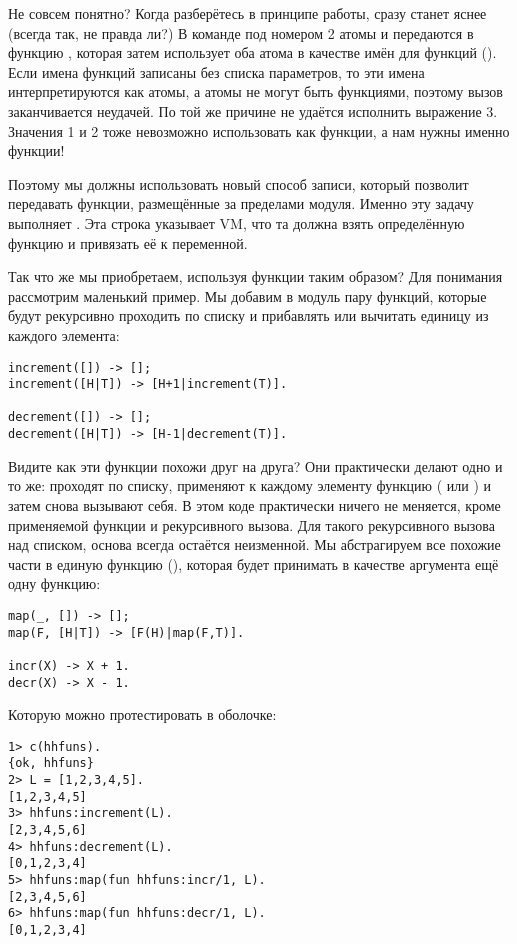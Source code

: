 Не совсем понятно? Когда разберётесь в принципе работы, сразу станет яснее (всегда так, не правда ли?) В команде под номером 2 атомы  и  передаются в функцию , которая затем использует оба атома в качестве имён для функций (). Если имена функций записаны без списка параметров, то эти имена интерпретируются как атомы, а атомы не могут быть функциями, поэтому вызов заканчивается неудачей. По той же причине не удаётся исполнить выражение 3. Значения 1 и 2 тоже невозможно использовать как функции, а нам нужны именно функции!

Поэтому мы должны использовать новый способ записи, который позволит передавать функции, размещённые за пределами модуля. Именно эту задачу выполняет . Эта строка указывает VM, что та должна взять определённую функцию и привязать её к переменной.

Так что же мы приобретаем, используя функции таким образом? Для понимания рассмотрим маленький пример. Мы добавим в модуль  пару функций, которые будут рекурсивно проходить по списку и прибавлять или вычитать единицу из каждого элемента:
\begin{lstlisting}[style=erlang]
increment([]) -> [];
increment([H|T]) -> [H+1|increment(T)].
 
decrement([]) -> [];
decrement([H|T]) -> [H-1|decrement(T)].
\end{lstlisting}

Видите как эти функции похожи друг на друга? Они практически делают одно и то же: проходят по списку, применяют к каждому элементу функцию (\ops{+\strut} или \ops{-\strut}) и затем снова вызывают себя. В этом коде практически ничего не меняется, кроме применяемой функции и рекурсивного вызова. Для такого рекурсивного вызова над списком, основа всегда остаётся неизменной. Мы абстрагируем все похожие части в единую функцию (), которая будет принимать в качестве аргумента ещё одну функцию:
\begin{lstlisting}[style=erlang]
map(_, []) -> [];
map(F, [H|T]) -> [F(H)|map(F,T)].
 
incr(X) -> X + 1.
decr(X) -> X - 1.
\end{lstlisting}

Которую можно протестировать в оболочке:
\begin{lstlisting}[style=erlang]
1> c(hhfuns).
{ok, hhfuns}
2> L = [1,2,3,4,5].
[1,2,3,4,5]
3> hhfuns:increment(L).
[2,3,4,5,6]
4> hhfuns:decrement(L).
[0,1,2,3,4]
5> hhfuns:map(fun hhfuns:incr/1, L).
[2,3,4,5,6]
6> hhfuns:map(fun hhfuns:decr/1, L).
[0,1,2,3,4]
\end{lstlisting}

